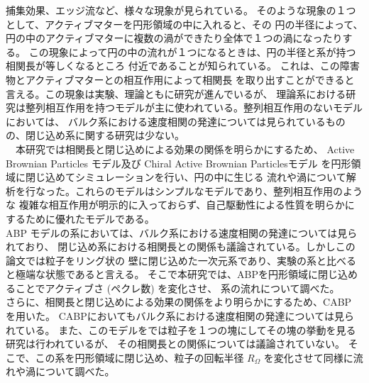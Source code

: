 \documentclass[/Users/ikedahajime/GitHub/reserch/master_report/thesis]{subfiles}
\begin{document}
捕集効果\cite{kaiserHowCaptureActive2012}、エッジ流\cite{soniOddFreeSurface2019}など、様々な現象が見られている。
そのような現象の１つとして、アクティブマターを円形領域の中に入れると、その
円の半径によって、円の中のアクティブマターに複数の渦ができたり全体で１つの渦になったりする。
この現象によって円の中の流れが１つになるときは、円の半径と系が持つ相関長が等しくなるところ
付近であることが知られている。
これは、この障害物とアクティブマターとの相互作用によって相関長%
を取り出すことができると言える。この現象は実験、理論ともに研究が進んでいるが、
理論系における研究は整列相互作用を持つモデルが主に使われている。整列相互作用のないモデルにおいては、
バルク系における速度相関の発達については見られているものの、閉じ込め系に関する研究は少ない。\\
　本研究では相関長と閉じ込めによる効果の関係を明らかにするため、
Active Brownian Particles モデル及び Chiral Active Brownian Particlesモデル
を円形領域に閉じ込めてシミュレーションを行い、円の中に生じる
流れや渦について解析を行なった。これらのモデルはシンプルなモデルであり、整列相互作用のような
複雑な相互作用が明示的に入っておらず、自己駆動性による性質を明らかにするために優れたモデルである。\\
ABP モデルの系においては、バルク系における速度相関の発達については見られており、
閉じ込め系における相関長との関係も議論されている\cite{capriniCollectiveEffectsConfined2021}。しかしこの論文では粒子をリング状の
壁に閉じ込めた一次元系であり、実験の系と比べると極端な状態であると言える。
そこで本研究では、ABPを円形領域に閉じ込めることでアクティブさ (ペクレ数) を変化させ、
系の流れについて調べた。\\
さらに、相関長と閉じ込めによる効果の関係をより明らかにするため、CABP を用いた。
CABPにおいてもバルク系における速度相関の発達については見られている。
また、このモデルをでは粒子を１つの塊にしてその塊の挙動を見る研究は行われている\cite{capriniSelfrevertingVorticesChiral2024}が、
その相関長との関係については議論されていない。
そこで、この系を円形領域に閉じ込め、粒子の回転半径 $R_\Omega$ を変化させて同様に流れや渦について調べた。


\end{document}
